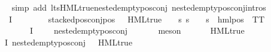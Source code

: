 \begin{isabellebody}
\ \ \ \ \isamarkupfalse%
\ {\isacharparenleft}{\kern0pt}simp\ add{\isacharcolon}{\kern0pt}\ lts{\isachardot}{\kern0pt}HML{\isacharunderscore}{\kern0pt}true{\isacharunderscore}{\kern0pt}nested{\isacharunderscore}{\kern0pt}empty{\isacharunderscore}{\kern0pt}pos{\isacharunderscore}{\kern0pt}conj\ nested{\isacharunderscore}{\kern0pt}empty{\isacharunderscore}{\kern0pt}pos{\isacharunderscore}{\kern0pt}conj{\isachardot}{\kern0pt}intros{\isacharparenleft}{\kern0pt}{}{\isacharparenright}{\kern0pt}{\isacharparenright}{\kern0pt}\isanewline
\ \ \isamarkupfalse%
\ {}\ \isamarkupfalse%
\ {\isasymphi}\ \ {\isachardoublequoteopen}{\isasymphi}{\isasymin}{\isasymPhi}\ {\isacharbackquote}{\kern0pt}\ I{\isachardoublequoteclose}\isanewline
\ \ \ \ \ \ \ \ {\isachardoublequoteopen}stacked{\isacharunderscore}{\kern0pt}pos{\isacharunderscore}{\kern0pt}conj{\isacharunderscore}{\kern0pt}pos\ {\isasymphi}{\isachardoublequoteclose}\ {\isachardoublequoteopen}{\isacharparenleft}{\kern0pt}{\isasymnot}\ HML{\isacharunderscore}{\kern0pt}true\ {\isasymphi}\ {\isasymlongrightarrow}\ {\isacharparenleft}{\kern0pt}{\isasymexists}{\isasymalpha}{\isachardot}{\kern0pt}\ {\isasymforall}s{\isachardot}{\kern0pt}\ {\isacharparenleft}{\kern0pt}s\ {\isasymTurnstile}\ {\isasymphi}{\isacharparenright}{\kern0pt}\ {\isacharequal}{\kern0pt}\ {\isacharparenleft}{\kern0pt}s\ {\isasymTurnstile}\ hml{\isacharunderscore}{\kern0pt}pos\ {\isasymalpha}\ TT{\isacharparenright}{\kern0pt}{\isacharparenright}{\kern0pt}{\isacharparenright}{\kern0pt}{\isachardoublequoteclose}\isanewline
\ \ \ \ \ \ \ \ {\isachardoublequoteopen}{\isacharparenleft}{\kern0pt}{\isasymforall}{\isasympsi}{\isasymin}{\isasymPhi}\ {\isacharbackquote}{\kern0pt}\ I{\isachardot}{\kern0pt}\ {\isasympsi}\ {\isasymnoteq}\ {\isasymphi}\ {\isasymlongrightarrow}\ nested{\isacharunderscore}{\kern0pt}empty{\isacharunderscore}{\kern0pt}pos{\isacharunderscore}{\kern0pt}conj\ {\isasympsi}{\isacharparenright}{\kern0pt}{\isachardoublequoteclose}\isanewline
\ \ \ \ \isamarkupfalse%
\ meson\isanewline
\ \ \isamarkupfalse%
\ \isamarkupfalse%
\ {\isachardoublequoteopen}{\isasymnot}\ HML{\isacharunderscore}{\kern0pt}true\ {\isasymphi}{\isachardoublequoteclose}\ \isamarkupfalse%
\ {}{\isacharparenleft}{\kern0pt}{}{\isacharparenright}{\kern0pt}\ {\isacartoucheopen}{\isacharparenleft}{\kern0pt}{\isasymforall}{\isasympsi}{\isasymin}{\isasymPhi}\ {\isacharbackquote}{\kern0pt}\ I{\isachardot}{\kern0pt}\ nested{\isacharunderscore}{\kern0pt}empty{\isacharunderscore}{\kern0pt}pos{\isacharunderscore}{\kern0pt}conj\ {\isasympsi}\ {\isasymlongrightarrow}\ HML{\isacharunderscore}{\kern0pt}true\ {\isasympsi}{\isacharparenright}{\kern0pt}{\isacartoucheclose}\isanewline

\end{isabellebody}
